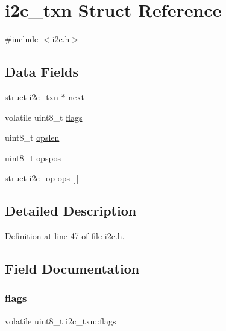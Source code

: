\hypertarget{structi2c__txn}{}\section{i2c\+\_\+txn Struct Reference}
\label{structi2c__txn}


{\ttfamily \#include $<$i2c.\+h$>$}

\subsection*{Data Fields}
\begin{DoxyCompactItemize}
\item 
struct \hyperlink{structi2c__txn}{i2c\+\_\+txn} $\ast$ \hyperlink{structi2c__txn_a11186c957c400dc51479a883575d4b0d}{next}
\item 
volatile uint8\+\_\+t \hyperlink{structi2c__txn_ab100decf3b628b0ae6f92a71735bef8b}{flags}
\item 
uint8\+\_\+t \hyperlink{structi2c__txn_ad936e904a9dcf5cb352e1b8a1dac60bc}{opslen}
\item 
uint8\+\_\+t \hyperlink{structi2c__txn_ac69407fdd93fd5d96075b8ebf77ecbca}{opspos}
\item 
struct \hyperlink{structi2c__op}{i2c\+\_\+op} \hyperlink{structi2c__txn_a49e5dbfb39ee1df7021f37ec67c8d2e0}{ops} \mbox{[}$\,$\mbox{]}
\end{DoxyCompactItemize}


\subsection{Detailed Description}


Definition at line 47 of file i2c.\+h.



\subsection{Field Documentation}
\mbox{\label{structi2c__txn_ab100decf3b628b0ae6f92a71735bef8b}} 
\subsubsection{\texorpdfstring{flags}{flags}}
{\footnotesize\ttfamily volatile uint8\+\_\+t i2c\+\_\+txn\+::flags}



